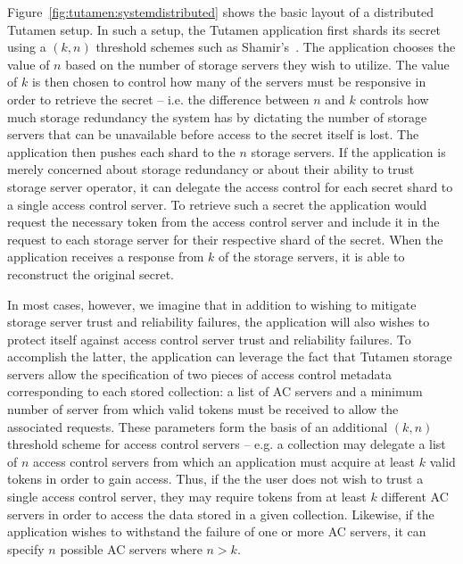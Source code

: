 Figure~\ref{fig:tutamen:systemdistributed} shows the basic layout of a
distributed Tutamen setup. In such a setup, the Tutamen application
first shards its secret using a $(k, n)$ threshold schemes such as
Shamir's~\cite{shamir1979}. The application chooses the value of $n$
based on the number of storage servers they wish to utilize. The value
of $k$ is then chosen to control how many of the servers must be
responsive in order to retrieve the secret -- i.e. the difference
between $n$ and $k$ controls how much storage redundancy the system
has by dictating the number of storage servers that can be unavailable
before access to the secret itself is lost. The application then
pushes each shard to the $n$ storage servers. If the application is
merely concerned about storage redundancy or about their ability to
trust storage server operator, it can delegate the access control for
each secret shard to a single access control server. To retrieve such
a secret the application would request the necessary token from the
access control server and include it in the request to each storage
server for their respective shard of the secret. When the application
receives a response from $k$ of the storage servers, it is able to
reconstruct the original secret.

In most cases, however, we imagine that in addition to wishing to
mitigate storage server trust and reliability failures, the
application will also wishes to protect itself against access control
server trust and reliability failures. To accomplish the latter, the
application can leverage the fact that Tutamen storage servers allow
the specification of two pieces of access control metadata
corresponding to each stored collection: a list of AC servers and a
minimum number of server from which valid tokens must be received to
allow the associated requests. These parameters form the basis of an
additional $(k, n)$ threshold scheme for access control servers --
e.g. a collection may delegate a list of $n$ access control servers
from which an application must acquire at least $k$ valid tokens in
order to gain access. Thus, if the the user does not wish to trust a
single access control server, they may require tokens from at least
$k$ different AC servers in order to access the data stored in a given
collection. Likewise, if the application wishes to withstand the
failure of one or more AC servers, it can specify $n$ possible AC
servers where $n > k$.

